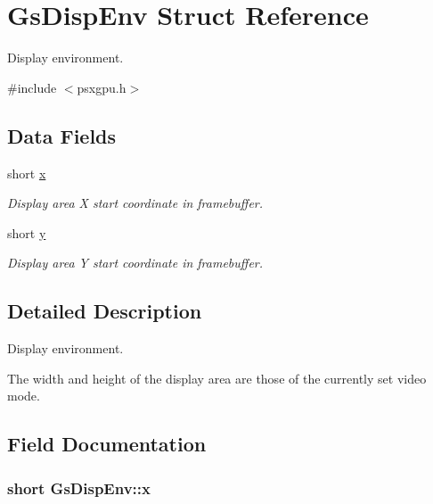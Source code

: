 \hypertarget{structGsDispEnv}{}\section{Gs\+Disp\+Env Struct Reference}
\label{structGsDispEnv}


Display environment.  




{\ttfamily \#include $<$psxgpu.\+h$>$}

\subsection*{Data Fields}
\begin{DoxyCompactItemize}
\item 
short \hyperlink{structGsDispEnv_a471f87bd77a7528868d29bf667af7d8c}{x}
\begin{DoxyCompactList}\small\item\em Display area X start coordinate in framebuffer. \end{DoxyCompactList}\item 
short \hyperlink{structGsDispEnv_ab1007184f6890f7f628699f43b553250}{y}
\begin{DoxyCompactList}\small\item\em Display area Y start coordinate in framebuffer. \end{DoxyCompactList}\end{DoxyCompactItemize}


\subsection{Detailed Description}
Display environment. 

The width and height of the display area are those of the currently set video mode. 

\subsection{Field Documentation}
\hypertarget{structGsDispEnv_a471f87bd77a7528868d29bf667af7d8c}{}
\subsubsection[{x}]{\setlength{\rightskip}{0pt plus 5cm}short Gs\+Disp\+Env\+::x}\label{structGsDispEnv_a471f87bd77a7528868d29bf667af7d8c}



